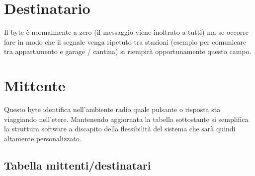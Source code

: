 \documentclass{article}
\begin{document}
    \section*{Destinatario}
    
    Il byte è normalmente a zero (il messaggio viene inoltrato a tutti) ma se occorre fare in modo che il segnale venga ripetuto tra stazioni (esempio per comunicare tra appartamento e garage / cantina) si riempirà opportunamente questo campo.
    
    \section*{Mittente}
    
    Questo byte identifica nell'ambiente radio quale pulsante o risposta sta viaggiando nell'etere. Mantenendo aggiornata la tabella sottostante si semplifica la struttura software a discapito della flessibilità del sistema che sarà quindi altamente personalizzato.
    
    \subsection{Tabella mittenti/destinatari}
    
    
\end{document}
